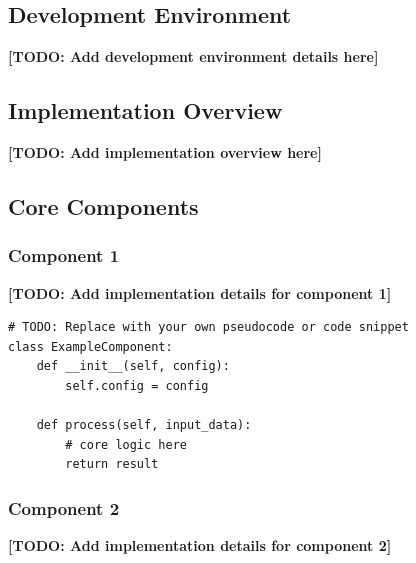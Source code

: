 
\subsection{Development Environment}


\textbf{[TODO: Add development environment details here]}

\subsection{Implementation Overview}


\textbf{[TODO: Add implementation overview here]}

\subsection{Core Components}


\subsubsection{Component 1}

\textbf{[TODO: Add implementation details for component 1]}

\begin{verbatim}
# TODO: Replace with your own pseudocode or code snippet
class ExampleComponent:
    def __init__(self, config):
        self.config = config

    def process(self, input_data):
        # core logic here
        return result
\end{verbatim}

\subsubsection{Component 2}
\textbf{[TODO: Add implementation details for component 2]}

